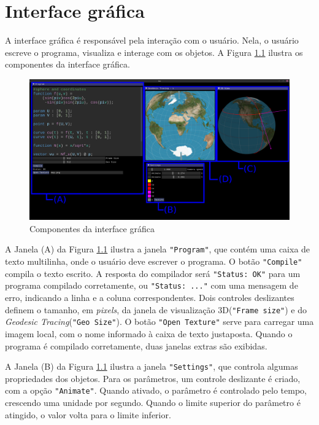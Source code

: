 \chapter{Interface gráfica}
\label{interface}

A interface gráfica é responsável pela interação com o usuário.
Nela, o usuário escreve o programa, visualiza e interage com os objetos.
A Figura \ref{img:comp} ilustra os componentes da interface gráfica.

\begin{figure}[!ht]
    \centering
    \includegraphics[width=\linewidth, frame]{comp.png}
    \caption{Componentes da interface gráfica}
    \label{img:comp}
\end{figure}

A Janela (A) da Figura \ref{img:comp} ilustra a janela \texttt{"Program"}, que contém uma
caixa de texto multilinha, onde o usuário deve escrever o programa.
O botão \texttt{"Compile"} compila o texto escrito.
A resposta do compilador será \texttt{"Status: OK"} para um programa compilado 
corretamente, ou \texttt{"Status: ..."} com uma mensagem de erro, indicando a
linha e a coluna correspondentes.
Dois controles deslizantes definem o tamanho, em \textit{pixels}, da janela
de visualização 3D(\texttt{"Frame size"}) e do \textit{Geodesic Tracing}(\texttt{"Geo Size"}).
O botão \texttt{"Open Texture"} serve para carregar uma imagem local,
com o nome informado à caixa de texto justaposta.
Quando o programa é compilado corretamente, duas janelas extras são exibidas.

A Janela (B) da Figura \ref{img:comp} ilustra a janela \texttt{"Settings"},
que controla algumas propriedades dos objetos.
Para os parâmetros, um controle deslizante é criado, com a opção \texttt{"Animate"}.
Quando ativado, o parâmetro é controlado pelo tempo,
crescendo uma unidade por segundo.
Quando o limite superior do parâmetro é atingido,
o valor volta para o limite inferior.

